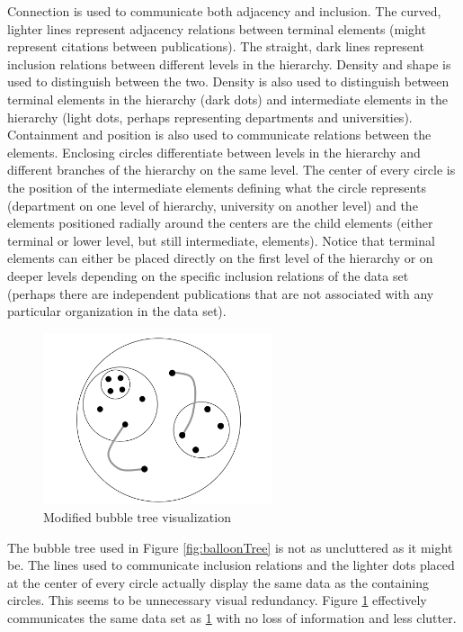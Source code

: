 Connection is used to communicate both adjacency and inclusion. The curved, lighter lines represent adjacency relations between terminal elements (might represent citations between publications). The straight, dark lines represent inclusion relations between different levels in the hierarchy. Density and shape is used to distinguish between the two. Density is also used to distinguish between terminal elements in the hierarchy (dark dots) and intermediate elements in the hierarchy (light dots, perhaps representing departments and universities). Containment and position is also used to communicate relations between the elements. Enclosing circles differentiate between levels in the hierarchy and different branches of the hierarchy on the same level. The center of every circle is the position of the intermediate elements defining what the circle represents (department on one level of hierarchy, university on another level) and the elements positioned radially around the centers are the child elements (either terminal or lower level, but still intermediate, elements). Notice that terminal elements can either be placed directly on the first level of the hierarchy or on deeper levels depending on the specific inclusion relations of the data set (perhaps there are independent publications that are not associated with any particular organization in the data set).

\begin{figure}[htb]
\centering
\includegraphics[width=0.6\textwidth]{vijay_bubble.png}
\caption{Modified bubble tree visualization}
\label{fig:balloon}
\end{figure}

The bubble tree used in Figure \ref{fig:balloonTree} is not as uncluttered as it might be. The lines used to communicate inclusion relations and the lighter dots placed at the center of every circle actually display the same data as the containing circles. This seems to be unnecessary visual redundancy. Figure \ref{fig:balloon} effectively communicates the same data set as \ref{fig:balloon} with no loss of information and less clutter.

